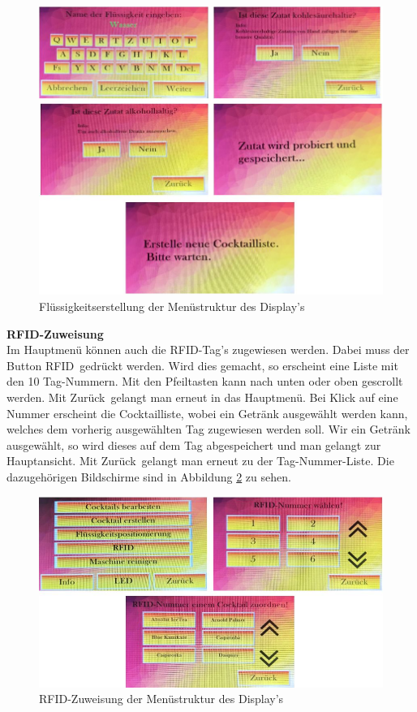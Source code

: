 \begin{figure}[H]
	\centering
	\includegraphics[width=\textwidth]{graphics/DisplayPositionierung2}
	\caption{Flüssigkeitserstellung der Menüstruktur des Display's}
	\label{fig:DisplayPositionierung2}
\end{figure}

\textbf{RFID-Zuweisung}\\
Im Hauptmenü können auch die RFID-Tag's zugewiesen werden. Dabei muss der Button \flqq RFID\frqq~\newline gedrückt werden. Wird dies gemacht, so erscheint eine Liste mit den 10 Tag-Nummern. Mit den Pfeiltasten kann nach unten oder oben gescrollt werden. Mit \flqq Zurück\frqq~gelangt man erneut in das Hauptmenü. Bei Klick auf eine Nummer erscheint die Cocktailliste, wobei ein Getränk ausgewählt werden kann, welches dem vorherig ausgewählten Tag zugewiesen werden soll. Wir ein Getränk ausgewählt, so wird dieses auf dem Tag abgespeichert und man gelangt zur Hauptansicht. Mit \flqq Zurück\frqq~gelangt man erneut zu der Tag-Nummer-Liste. Die dazugehörigen Bildschirme sind in Abbildung \ref{fig:DisplayRFID} zu sehen. 

\begin{figure}[H]
	\centering
	\includegraphics[width=\textwidth]{graphics/DisplayRFID}
	\caption{RFID-Zuweisung der Menüstruktur des Display's}
	\label{fig:DisplayRFID}
\end{figure}


